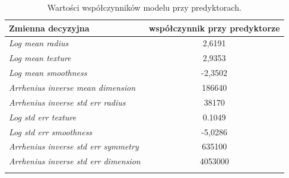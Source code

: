 


\begin{longtable}{l | c}
	\centering
	Zmienna decyzyjna & współczynnik przy predyktorze \\
	\hline
	\textit{Log mean radius} & 2,6191 \\
	\textit{Log mean texture} & 2,9353 \\
	\textit{Log mean smoothness} & -2,3502 \\
	\textit{Arrhenius inverse mean dimension} & 186640 \\
	\textit{Arrhenius inverse std err radius} & 38170 \\
	\textit{Log std err texture} & 0.1049 \\
	\textit{Log std err smoothness} & -5,0286 \\
	\textit{Arrhenius inverse std err symmetry} & 635100 \\
	\textit{Arrhenius inverse std err dimension} & 4053000 \\
	\caption{Wartości współczynników modelu przy predyktorach.}
	\label{svm:1}
\end{longtable} 

